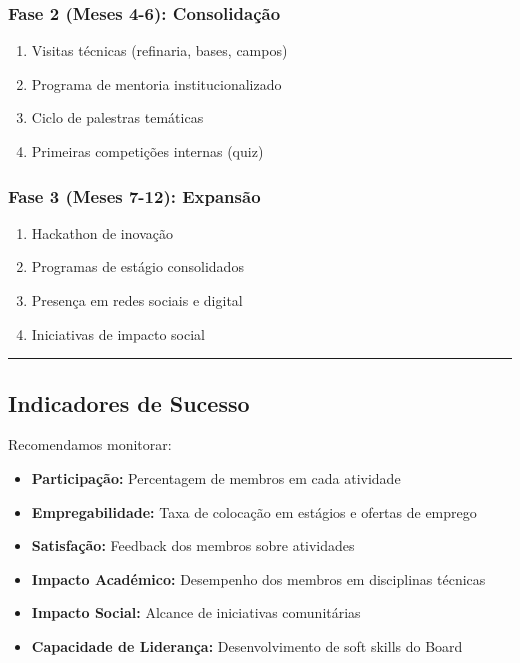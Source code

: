 \documentclass[12pt,a4paper]{article}
\begin{document}
\subsubsection*{Fase 2 (Meses 4-6): Consolidação}
\begin{enumerate}[itemsep=0.2cm]
    \item Visitas técnicas (refinaria, bases, campos)
    \item Programa de mentoria institucionalizado
    \item Ciclo de palestras temáticas
    \item Primeiras competições internas (quiz)
\end{enumerate}

\subsubsection*{Fase 3 (Meses 7-12): Expansão}
\begin{enumerate}[itemsep=0.2cm]
    \item Hackathon de inovação
    \item Programas de estágio consolidados
    \item Presença em redes sociais e digital
    \item Iniciativas de impacto social
\end{enumerate}

\textcolor{spe-secondary}{\hspace{0.5cm}\rule{0.4\linewidth}{0.8pt}}
\subsection{Indicadores de Sucesso}

Recomendamos monitorar:

\begin{itemize}[itemsep=0.2cm]
    \item \textbf{Participação:} Percentagem de membros em cada atividade
    \item \textbf{Empregabilidade:} Taxa de colocação em estágios e ofertas de emprego
    \item \textbf{Satisfação:} Feedback dos membros sobre atividades
    \item \textbf{Impacto Académico:} Desempenho dos membros em disciplinas técnicas
    \item \textbf{Impacto Social:} Alcance de iniciativas comunitárias
    \item \textbf{Capacidade de Liderança:} Desenvolvimento de soft skills do Board
\end{itemize}
\end{document}
